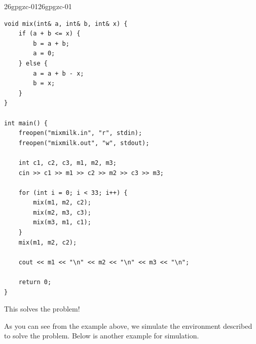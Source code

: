 \documentclass[../../../main.tex]{subfiles}
\begin{document}
\begin{solution}
\begin{cppboxSolution}{26gpgzc-01}{26gpgzc-01}
\begin{lstlisting}[style=cppstyle]
void mix(int& a, int& b, int& x) {
    if (a + b <= x) {
        b = a + b;
        a = 0;
    } else {
        a = a + b - x;
        b = x;
    }
}

int main() {
    freopen("mixmilk.in", "r", stdin);
    freopen("mixmilk.out", "w", stdout);

    int c1, c2, c3, m1, m2, m3;
    cin >> c1 >> m1 >> c2 >> m2 >> c3 >> m3;

    for (int i = 0; i < 33; i++) {
        mix(m1, m2, c2);
        mix(m2, m3, c3);
        mix(m3, m1, c1);
    }
    mix(m1, m2, c2);

    cout << m1 << "\n" << m2 << "\n" << m3 << "\n";

    return 0;
}
\end{lstlisting}
\end{cppboxSolution}

This solves the problem!
\end{solution}

As you can see from the example above, we simulate the environment
described to solve the problem. Below is another example for
simulation.
\end{document}
